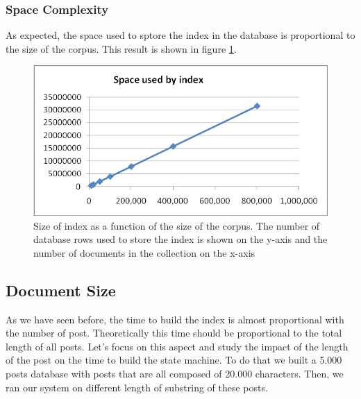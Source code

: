 \documentclass[10pt]{report}
\begin{document}
\subsubsection{Space Complexity}
As expected, the space used to sptore the index in the database is
proportional to the size of the corpus. This result is shown in figure
\ref{fig:corpsizespacecomplexbuildindex}.

\begin{figure}
  \begin{center}
    \includegraphics[width=\textwidth,height=!]{corpsizespacecomplexbuildindex}
  \end{center}
    \caption{Size of index as a function of the size of the
      corpus. The number of database rows used to store the index is
      shown on the y-axis and the number of documents in the
      collection on the x-axis} 
    \label{fig:corpsizespacecomplexbuildindex}
\end{figure}


\subsection{Document Size} 
As we have seen before, the time to build the index is almost
proportional with the number of post. Theoretically this time should
be proportional to the total length of all posts. Let’s focus on this
aspect and study the impact of the length of the post on the time to
build the state machine. To do that we built a 5.000 posts database
with posts that are all composed of 20.000 characters. Then, we ran
our system on different length of substring of these posts.  
\end{document}
